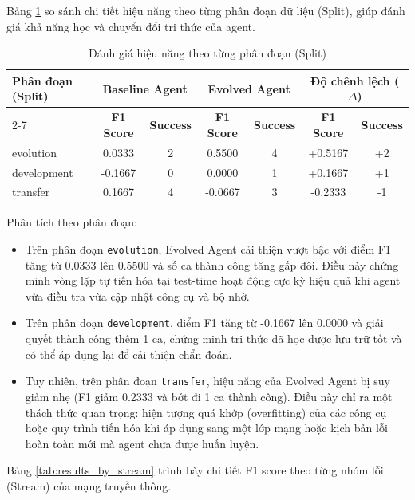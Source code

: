 Bảng \ref{tab:results_by_split} so sánh chi tiết hiệu năng theo từng phân đoạn dữ liệu (Split), giúp đánh giá khả năng học và chuyển đổi tri thức của agent.

\begin{table}[htbp]
\centering
\caption{Đánh giá hiệu năng theo từng phân đoạn (Split)}
\label{tab:results_by_split}
\begin{tabular}{|l|c|c|c|c|c|c|}
\hline
\multirow{2}{*}{\textbf{Phân đoạn (Split)}} & \multicolumn{2}{c|}{\textbf{Baseline Agent}} & \multicolumn{2}{c|}{\textbf{Evolved Agent}} & \multicolumn{2}{c|}{\textbf{Độ chênh lệch ($\Delta$)}} \\ \cline{2-7} 
 & \textbf{F1 Score} & \textbf{Success} & \textbf{F1 Score} & \textbf{Success} & \textbf{F1 Score} & \textbf{Success} \\ \hline
evolution & 0.0333 & 2 & 0.5500 & 4 & +0.5167 & +2 \\ \hline
development & -0.1667 & 0 & 0.0000 & 1 & +0.1667 & +1 \\ \hline
transfer & 0.1667 & 4 & -0.0667 & 3 & -0.2333 & -1 \\ \hline
\end{tabular}
\end{table}

Phân tích theo phân đoạn:
\begin{itemize}
    \item Trên phân đoạn \texttt{evolution}, Evolved Agent cải thiện vượt bậc với điểm F1 tăng từ 0.0333 lên 0.5500 và số ca thành công tăng gấp đôi. Điều này chứng minh vòng lặp tự tiến hóa tại test-time hoạt động cực kỳ hiệu quả khi agent vừa điều tra vừa cập nhật công cụ và bộ nhớ.
    \item Trên phân đoạn \texttt{development}, điểm F1 tăng từ -0.1667 lên 0.0000 và giải quyết thành công thêm 1 ca, chứng minh tri thức đã học được lưu trữ tốt và có thể áp dụng lại để cải thiện chẩn đoán.
    \item Tuy nhiên, trên phân đoạn \texttt{transfer}, hiệu năng của Evolved Agent bị suy giảm nhẹ (F1 giảm 0.2333 và bớt đi 1 ca thành công). Điều này chỉ ra một thách thức quan trọng: hiện tượng quá khớp (overfitting) của các công cụ hoặc quy trình tiến hóa khi áp dụng sang một lớp mạng hoặc kịch bản lỗi hoàn toàn mới mà agent chưa được huấn luyện.
\end{itemize}

Bảng \ref{tab:results_by_stream} trình bày chi tiết F1 score theo từng nhóm lỗi (Stream) của mạng truyền thông.

